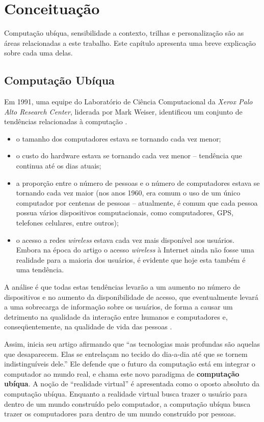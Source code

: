 \chapter{Conceituação}
\label{ch:conceitos}

Computação ubíqua, sensibilidade a contexto, trilhas e personalização são as áreas relacionadas a este trabalho. Este capítulo apresenta uma breve explicação sobre cada uma delas.


\section{Computação Ubíqua}
\label{sec:ubicomp}

Em 1991, uma equipe do Laboratório de Ciência Computacional da {\em Xerox Palo Alto Research Center}, liderada por Mark Weiser, identificou um conjunto de tendências relacionadas à computação \cite{weiser91}.

\begin{itemize}
  \item o tamanho dos computadores estava se tornando cada vez menor;
  \item o custo do hardware estava se tornando cada vez menor -- tendência que continua até os dias atuais;
  \item a proporção entre o número de pessoas e o número de computadores estava se tornando cada vez maior (nos anos 1960, era comum o uso de um único computador por centenas de pessoas -- atualmente, é comum que cada pessoa possua vários dispositivos computacionais, como computadores, GPS, telefones celulares, entre outros);
  \item o acesso a redes {\em wireless} estava cada vez mais disponível aos usuários. Embora na época do artigo o acesso {\em wireless} à Internet ainda não fosse uma realidade para a maioria dos usuários, é evidente que hoje esta também é uma tendência.
\end{itemize}

A análise é que todas estas tendências levarão a um aumento no número de dispositivos e no aumento da disponibilidade de acesso, que eventualmente levará a uma sobrecarga de informação sobre os usuários, de forma a causar um detrimento na qualidade da interação entre humanos e computadores e, conseqüentemente, na qualidade de vida das pessoas \cite{weiser96}.

Assim,  inicia seu artigo afirmando que ``as tecnologias mais profundas são aquelas que desaparecem. Elas se entrelaçam no tecido do dia-a-dia até que se tornem indistinguíveis dele.'' Ele defende que o futuro da computação está em integrar o computador ao mundo real, e chama este novo paradigma de {\bf computação ubíqua}. A noção de ``realidade virtual'' é apresentada como o oposto absoluto da computação ubíqua. Enquanto a realidade virtual busca trazer o usuário para dentro de um mundo construído pelo computador, a computação ubíqua busca trazer os computadores para dentro de um mundo construído por pessoas.

